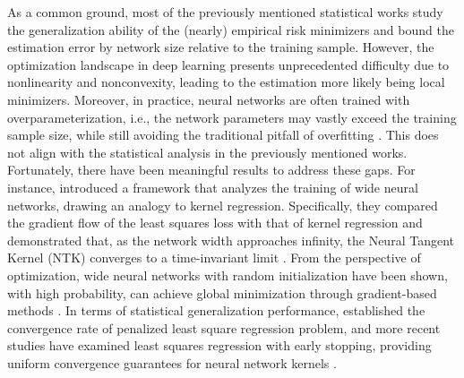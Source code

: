 As a common ground, most of the previously mentioned statistical works study the generalization ability of the (nearly) empirical risk minimizers and bound the estimation error by network size relative to the training sample. 
However, the optimization landscape in deep learning presents unprecedented difficulty due to nonlinearity and nonconvexity, leading to the estimation more likely being local minimizers. 
Moreover, in practice, neural networks are often trained with overparameterization, i.e., the network parameters may vastly exceed the training sample size, while still avoiding the traditional pitfall of overfitting \citep{zhang2021understanding}. This does not align with the statistical analysis in the previously mentioned works. 
Fortunately, there have been meaningful results to address these gaps. 
For instance, \citet{jacot2018neural} introduced a framework that analyzes the training of wide neural networks, drawing an analogy to kernel regression. 
Specifically, they compared the gradient flow of the least squares loss with that of kernel regression and demonstrated that, as the network width approaches infinity, the Neural Tangent Kernel (NTK) converges to a time-invariant limit \citep{arora2019exact,lee2019wide,bietti2019inductive,geifman2020similarity,chen2020deep,bietti2020deep,lai2023generalization}. 
From the perspective of optimization, wide neural networks with random initialization have been shown, with high probability, can achieve global minimization through gradient-based methods \citep{DBLP:journals/corr/abs-1810-02054, li2018learning, allen2019convergence}. 
In terms of statistical generalization performance, \citet{hu2021regularization,suh2021non} established the convergence rate of penalized least square regression problem, and more recent studies have examined least squares regression with early stopping, providing uniform convergence guarantees for neural network kernels \citep{lai2023generalization,li2023statistical,lai2023residual}.

